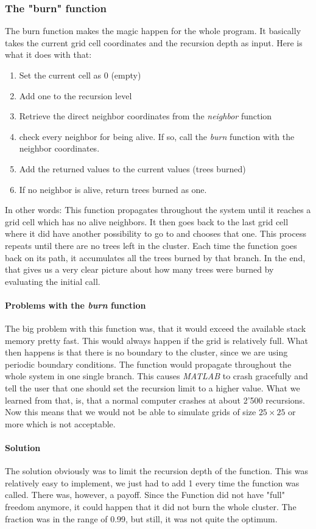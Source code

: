 \documentclass[11pt]{article}
\begin{document}
\subsubsection{The "burn" function}
The burn function makes the magic happen for the whole program. It basically takes the current grid cell coordinates and the recursion depth as input. Here is what it does with that:
\begin{enumerate}
\item Set the current cell as 0 (empty)
\item Add one to the recursion level
\item Retrieve the direct neighbor coordinates from the \emph{neighbor} function
\item check every neighbor for being alive. If so, call the \emph{burn} function with the neighbor coordinates.
\item Add the returned values to the current values (trees burned)
\item If no neighbor is alive, return trees burned as one.
\end {enumerate}
In other words: This function propagates throughout the system until it reaches a grid cell which has no alive neighbors. It then goes back to the last grid cell where it did have another possibility to go to and chooses that one. This process repeats until there are no trees left in the cluster. Each time the function goes back on its path, it accumulates all the trees burned by that branch. In the end, that gives us a very clear picture about how many trees were burned by evaluating the initial call.
\paragraph*{Problems with the \emph{burn} function}
The big problem with this function was, that it would exceed the available stack memory pretty fast. This would always happen if the grid is relatively full. What then happens is that there is no boundary to the cluster, since we are using periodic boundary conditions. The function would propagate throughout the whole system in one single branch. This causes \emph{MATLAB} to crash gracefully and tell the user that one should set the recursion limit to a higher value. What we learned from that, is, that a normal computer crashes at about 2'500 recursions. Now this means that we would not be able to simulate grids of size $25 \times 25$ or more which is not acceptable.
\paragraph*{Solution}
The solution obviously was to limit the recursion depth of the function. This was relatively easy to implement, we just had to add 1 every time the function was called. There was, however, a payoff. Since the Function did not have "full" freedom anymore, it could happen that it did not burn the whole cluster. The fraction was in the range of 0.99, but still, it was not quite the optimum. 
\end{document}
